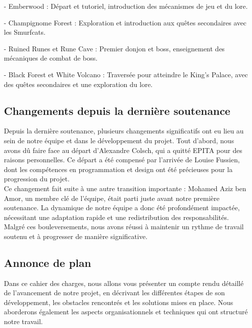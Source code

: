   

- Emberwood : Départ et tutoriel, introduction des mécanismes de jeu et du lore. 

- Champignome Forest : Exploration et introduction aux quêtes secondaires avec les Smurfcats. 

- Ruined Runes et Rune Cave : Premier donjon et boss, enseignement des mécaniques de combat de boss. 

- Black Forest et White Volcano : Traversée pour atteindre le King's Palace, avec des quêtes secondaires et une exploration du lore. 

 


\subsection{Changements depuis la dernière soutenance}

Depuis la dernière soutenance, plusieurs changements significatifs ont eu lieu au sein de notre équipe et dans le développement du projet. 
Tout d'abord, nous avons dû faire face au départ d'Alexandre Colsch, qui a quitté EPITA  pour des raisons personnelles. 
Ce départ a été compensé par l'arrivée de Louise Fussien, dont les compétences en programmation et design ont été précieuses pour la progression du projet.
\\

Ce changement fait suite à une autre transition importante : Mohamed Aziz ben Amor, un membre clé de l'équipe, était parti juste avant notre première soutenance. 
La dynamique de notre équipe a donc été profondément impactée, nécessitant une adaptation rapide et une redistribution des responsabilités.
\\

Malgré ces bouleversements, nous avons réussi à maintenir un rythme de travail soutenu et à progresser de manière significative.
\\

\subsection{Annonce de plan}

Dans ce cahier des charges, nous allons vous présenter un compte rendu détaillé de l'avancement de notre projet, en décrivant les différentes étapes de son développement, les obstacles rencontrés et les solutions mises en place. Nous aborderons également les aspects organisationnels et techniques qui ont structuré notre travail.
\newline

